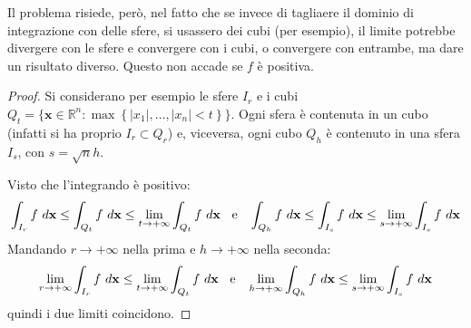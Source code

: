 \documentclass[11pt, a4paper]{scrartcl}
\theoremstyle{definition}
\numberwithin{esempio}{section}
\theoremstyle{definition}
\numberwithin{obs}{section}
\numberwithin{nota}{section}
\numberwithin{equation}{subsection}
\begin{document}
Il problema risiede, per\`o, nel fatto che se invece di tagliaere il dominio di integrazione con delle sfere, si usassero dei cubi (per esempio), il limite potrebbe divergere con le sfere e convergere con i cubi, o convergere con entrambe, ma dare un risultato diverso. 
Questo non accade se $f$ \`e positiva. 
\begin{proof}
	Si considerano per esempio le sfere $I_r$ e i cubi $Q_t = \big\{ \mathbf{x} \in \mathbb{R}^n : \max \left\{ \lvert x_1 \rvert , \ldots, \lvert  x_n\rvert < t \right\}  \big\} $. 
	Ogni sfera \`e contenuta in un cubo (infatti si ha proprio $I_r \subset Q_r$) e, viceversa, ogni cubo $Q_h$ \`e contenuto in una sfera $I_s$, con $s= \sqrt{n} h$.

	Visto che l'integrando \`e positivo:
	\[
	\int_{I_r} f \ d\mathbf{x} \le \int_{Q_t} f \ d\mathbf{x} \le \lim_{t \to +\infty} \int_{Q_t} f \ d\mathbf{x} \hspace{.2cm} \text{ e } \hspace{.2cm}\int_{Q_h} f \ d\mathbf{x} \le \int_{I_s} f \ d\mathbf{x} \le \lim_{s \to +\infty} \int_{I_s} f \ d\mathbf{x} 
	\] 
Mandando $r\to+\infty$ nella prima e $h\to+\infty$ nella seconda:	
\[
\lim_{r \to +\infty} \int_{I_r} f \ d\mathbf{x} \le \lim_{t \to +\infty} \int_{Q_t} f \ d\mathbf{x} \hspace{.2cm} \text{ e } \hspace{.2cm} \lim_{h \to +\infty} \int_{Q_h} f \ d \mathbf{x} \le \lim_{s \to +\infty} \int_{I_s} f \ d\mathbf{x} 
\]
quindi i due limiti coincidono. 
\end{proof}
\end{document}
